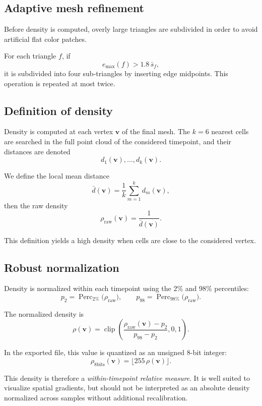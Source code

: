 \documentclass[11pt,a4paper]{article}
\begin{document}
\subsection{Adaptive mesh refinement}

Before density is computed, overly large triangles are subdivided in order to avoid artificial flat color patches.

For each triangle $f$, if
\[
e_{\max}(f) > 1.8\,\bar{s}_f,
\]
it is subdivided into four sub-triangles by inserting edge midpoints. This operation is repeated at most twice.

\subsection{Definition of density}

Density is computed at each vertex $\mathbf{v}$ of the final mesh. The $k=6$ nearest cells are searched in the full point cloud of the considered timepoint, and their distances are denoted
\[
d_1(\mathbf{v}),\dots,d_k(\mathbf{v}).
\]

We define the local mean distance
\[
\bar{d}(\mathbf{v})=\frac{1}{k}\sum_{m=1}^{k} d_m(\mathbf{v}),
\]
then the raw density
\[
\rho_{\mathrm{raw}}(\mathbf{v})=\frac{1}{\bar{d}(\mathbf{v})}.
\]

This definition yields a high density when cells are close to the considered vertex.

\subsection{Robust normalization}

Density is normalized within each timepoint using the 2\% and 98\% percentiles:
\[
p_2 = \operatorname{Perc}_{2\%}\big(\rho_{\mathrm{raw}}\big),
\qquad
p_{98} = \operatorname{Perc}_{98\%}\big(\rho_{\mathrm{raw}}\big).
\]

The normalized density is
\[
\rho(\mathbf{v})=
\operatorname{clip}\left(
\frac{\rho_{\mathrm{raw}}(\mathbf{v})-p_2}{p_{98}-p_2},
0,1
\right).
\]

In the exported file, this value is quantized as an unsigned 8-bit integer:
\[
\rho_{8\text{bits}}(\mathbf{v})=\lfloor 255\,\rho(\mathbf{v})\rfloor.
\]

This density is therefore a \emph{within-timepoint relative measure}. It is well suited to visualize spatial gradients, but should not be interpreted as an absolute density normalized across samples without additional recalibration.
\end{document}
